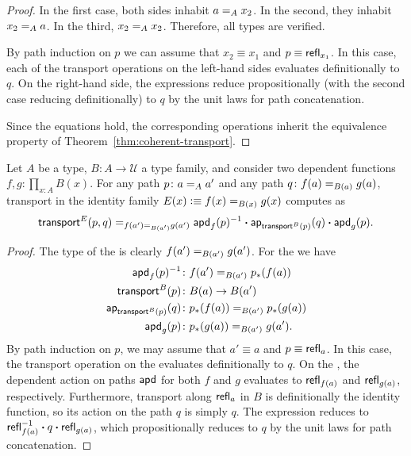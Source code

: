 \begin{proof}
    In the first case, both sides inhabit $a\mathrel{=_{A}}x_2$. In the second, they inhabit $x_2\mathrel{=_{A}}a$. In the third, $x_2\mathrel{=_{A}}x_2$. Therefore, all types are verified.

    By path induction on $p$ we can assume that $x_2\equiv x_1$ and $p\equiv\mathsf{refl}_{x_1}$. In this case, each of the transport operations on the left-hand sides evaluates definitionally to $q$. On the right-hand side, the expressions reduce propositionally (with the second case reducing definitionally) to $q$ by the unit laws for path concatenation.

    Since the equations hold, the corresponding operations inherit the equivalence property of Theorem~\ref{thm:coherent-transport}.
\end{proof}

\begin{thm}
    Let\/ $A$ be a type, $B\colon A\to\mathcal{U}$ a type family, and consider two dependent functions\/ $f,g\colon\prod_{x\colon A}B(x)$. For any path\/ $p\colon a\eq Aa'$ and any path\/ $q\colon f(a)\eq{B(a)}g(a)$, transport in the identity family\/ $E(x)\mathrel{\vcentcolon}\equiv f(x)\mathrel{=_{B(x)}}g(x)$ computes as
    \[
        \mathsf{transport}^E(p,q)
            \mathrel{=_{f(a')\mathrel{=_{B(a')}}g(a')}} 
            \mathsf{apd}_f(p)^{-1}
                \mathbin{\boldsymbol{\cdot}}\mathsf{ap}_{\mathsf{transport}^B(p)}(q)\mathbin{\boldsymbol{\cdot}}\mathsf{apd}_g(p).
    \]
\end{thm}


\begin{proof}
    The type of the \lhs is clearly $f(a')\mathrel{=_{B(a')}}g(a')$. For the \rhs we have
    \begin{align*}
        \fun{apd}_f(p)^{-1}&\colon f(a')\eq{B(a')}p_*(f(a))\\
        \fun{transport}^B(p)&\colon B(a)\to B(a')\\
        \fun{ap}_{\fun{transport}^B(p)}(q)
            &\colon p_*(f(a))\eq{B(a')}p_*(g(a))\\
        \fun{apd}_g(p)&\colon p_*(g(a))\eq{B(a')}g(a').
    \end{align*}
    By path induction on $p$, we may assume that $a'\equiv a$ and $p\equiv\mathsf{refl}_a$. In this case, the transport operation on the \lhs evaluates definitionally to $q$. On the \rhs, the dependent action on paths $\mathsf{apd}$ for both $f$ and $g$ evaluates to $\mathsf{refl}_{f(a)}$ and $\mathsf{refl}_{g(a)}$, respectively. Furthermore, transport along $\mathsf{refl}_a$ in $B$ is definitionally the identity function, so its action on the path $q$ is simply $q$. The expression reduces to $\mathsf{refl}_{f(a)}^{-1}\mathbin{\boldsymbol{\cdot}} q\mathbin{\boldsymbol{\cdot}}\mathsf{refl}_{g(a)}$, which propositionally reduces to $q$ by the unit laws for path concatenation.
    \end{proof}


